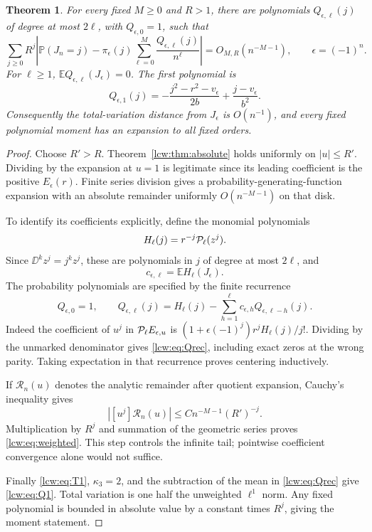 \documentclass[11pt,letterpaper]{article}
\newtheorem{theorem}{Theorem}[section]
\theoremstyle{remark}\newtheorem{remark}[theorem]{Remark}
\newcommand{\E}{\mathbb E}\newcommand{\Pp}{\mathbb P}
\begin{document}
\begin{theorem}\label{lcw:thm:weighted}
For every fixed $M\ge0$ and $R>1$, there are polynomials $Q_{\epsilon,\ell}(j)$ of degree at most $2\ell$, with $Q_{\epsilon,0}=1$, such that
\begin{equation}\label{lcw:eq:weighted}
 \sum_{j\ge0}R^j\left|\Pp(J_n=j)-\pi_\epsilon(j)
 \sum_{\ell=0}^M\frac{Q_{\epsilon,\ell}(j)}{n^\ell}\right|
 =O_{M,R}(n^{-M-1}),\qquad\epsilon=(-1)^n.
\end{equation}
For $\ell\ge1$, $\E Q_{\epsilon,\ell}(J_\epsilon)=0$. The first polynomial is
\begin{equation}\label{lcw:eq:Q1}
 Q_{\epsilon,1}(j)=-\frac{j^2-r^2-v_\epsilon}{2b}
                       +\frac{j-v_\epsilon}{b^2}.
\end{equation}
Consequently the total-variation distance from $J_\epsilon$ is $O(n^{-1})$, and every fixed polynomial moment has an expansion to all fixed orders.
\end{theorem}
\begin{proof}
Choose $R'>R$. Theorem~\ref{lcw:thm:absolute} holds uniformly on $|u|\le R'$. Dividing by the expansion at $u=1$ is legitimate since its leading coefficient is the positive $E_\epsilon(r)$. Finite series division gives a probability-generating-function expansion with an absolute remainder uniformly $O(n^{-M-1})$ on that disk.

To identify its coefficients explicitly, define the monomial polynomials
\begin{equation}\label{lcw:eq:monomial}
 H_\ell(j)=r^{-j}\mathcal P_\ell(z^j).
\end{equation}
Since $\DD^kz^j=j^kz^j$, these are polynomials in $j$ of degree at most $2\ell$, and
\[
 c_{\epsilon,\ell}=\E H_\ell(J_\epsilon).
\]
The probability polynomials are specified by the finite recurrence
\begin{equation}\label{lcw:eq:Qrec}
 Q_{\epsilon,0}=1,\qquad
 Q_{\epsilon,\ell}(j)=H_\ell(j)-\sum_{h=1}^\ell
 c_{\epsilon,h}Q_{\epsilon,\ell-h}(j).
\end{equation}
Indeed the coefficient of $u^j$ in $\mathcal P_\ell E_{\epsilon,u}$ is
$(1+\epsilon(-1)^j)r^jH_\ell(j)/j!$. Dividing by the unmarked denominator gives \eqref{lcw:eq:Qrec}, including exact zeros at the wrong parity. Taking expectation in that recurrence proves centering inductively.

If $\mathcal R_n(u)$ denotes the analytic remainder after quotient expansion, Cauchy's inequality gives
\[
 |[u^j]\mathcal R_n(u)|\le C n^{-M-1}(R')^{-j}.
\]
Multiplication by $R^j$ and summation of the geometric series proves \eqref{lcw:eq:weighted}. This step controls the infinite tail; pointwise coefficient convergence alone would not suffice.

Finally \eqref{lcw:eq:T1}, $\kappa_3=2$, and the subtraction of the mean in \eqref{lcw:eq:Qrec} give \eqref{lcw:eq:Q1}. Total variation is one half the unweighted $\ell^1$ norm. Any fixed polynomial is bounded in absolute value by a constant times $R^j$, giving the moment statement.
\end{proof}
\end{document}
